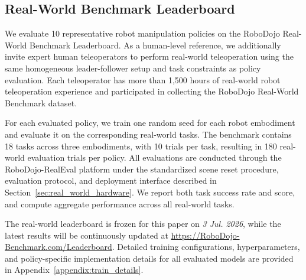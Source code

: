 

\subsection{Real-World Benchmark Leaderboard}
\label{sec:real_leaderboard}

We evaluate 10 representative robot manipulation policies on the RoboDojo Real-World Benchmark Leaderboard. As a human-level reference, we additionally invite expert human teleoperators to perform real-world teleoperation using the same homogeneous leader-follower setup and task constraints as policy evaluation. Each teleoperator has more than 1,500 hours of real-world robot teleoperation experience and participated in collecting the RoboDojo Real-World Benchmark dataset.

For each evaluated policy, we train one random seed for each robot embodiment and evaluate it on the corresponding real-world tasks. The benchmark contains 18 tasks across three embodiments, with 10 trials per task, resulting in 180 real-world evaluation trials per policy. All evaluations are conducted through the RoboDojo-RealEval platform under the standardized scene reset procedure, evaluation protocol, and deployment interface described in Section~\ref{sec:real_world_hardware}. We report both task success rate and score, and compute aggregate performance across all real-world tasks.

The real-world leaderboard is frozen for this paper on \textit{3 Jul. 2026}, while the latest results will be continuously updated at \href{https://RoboDojo-Benchmark.com/Leaderboard}{https://RoboDojo-Benchmark.com/Leaderboard}. Detailed training configurations, hyperparameters, and policy-specific implementation details for all evaluated models are provided in Appendix~\ref{appendix:train_details}.

